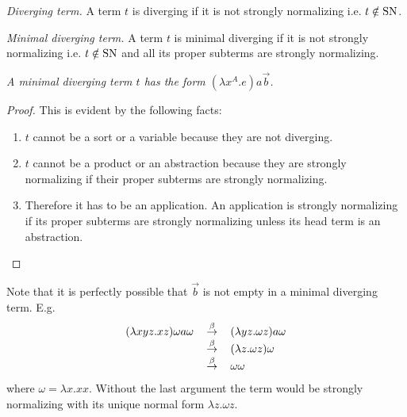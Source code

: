 \begin{definition}
    \emph{Diverging term.} A term $t$ is diverging if it is not strongly
    normalizing i.e. $t \notin {\text{SN}}$.
\end{definition}





\begin{definition}
    \emph{Minimal diverging term.} A term $t$ is minimal diverging if it is not
    strongly normalizing i.e. $t \notin {\text{SN}}$ and all its proper subterms are
    strongly normalizing.
\end{definition}




\begin{theorem}
    \label{thm:FormMinimalDiverging}
    \emph{A minimal diverging term $t$ has the form $(\lambda x^A.e) a \vec b$.}

    \begin{proof}
        This is evident by the following facts:
        \begin{enumerate}
        \item $t$ cannot be a sort or a variable because they are not diverging.

        \item $t$ cannot be a product or an abstraction because they are
            strongly normalizing if their proper subterms are strongly
            normalizing.

        \item Therefore it has to be an application. An application is strongly
            normalizing if its proper subterms are strongly normalizing unless
            its head term is an abstraction.
        \end{enumerate}
    \end{proof}
\end{theorem}

Note that it is perfectly possible that $\vec b$ is not empty in a minimal
diverging term. E.g.
$$
\begin{array}{lll}
    (\lambda x y z. x z) \omega a \omega
    &{\,\stackrel{\beta}{\to}\,}&
    (\lambda y z. \omega z) a \omega
    \\
    &{\,\stackrel{\beta}{\to}\,}&
    (\lambda z. \omega z) \omega
    \\
    &{\,\stackrel{\beta}{\to}\,}&
    \omega \omega
\end{array}
$$
where $\omega = \lambda x. x x$. Without the last argument the term would be
strongly normalizing with its unique normal form $\lambda z. \omega z$.




